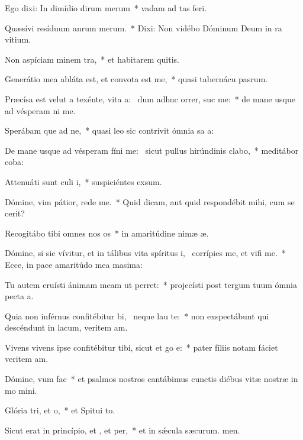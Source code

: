 \item Ego dixi: In dimídio dirum merum~* vadam ad tas feri.
\item Quæsívi resíduum anrum merum.~* Dixi: Non vidébo Dóminum Deum in ra vitium.
\item Non aspíciam minem tra,~* et habitarem quitis.
\item Generátio mea abláta est, et convota est  me,~* quasi tabernácu pasrum.
\item Præcísa est velut a texénte, vita a:~\pscross{} dum adhuc orrer, suc me:~* de mane usque ad vésperam ni me.
\item Sperábam que ad ne,~* quasi leo sic contrívit ómnia sa a:
\item De mane usque ad vésperam fíni me:~\pscross{} sicut pullus hirúndinis  clabo,~* meditábor  coba:
\item Attenuáti sunt culi i,~* suspiciéntes  exsum.
\item Dómine, vim pátior, rede  me.~* Quid dicam, aut quid respondébit mihi, cum se cerit?
\item Recogitábo tibi omnes nos os~* in amaritúdine nimæ æ.
\item Dómine, si sic vívitur, et in tálibus vita spíritus i,~\pscross{} corrípies me, et vifi me.~* Ecce, in pace amaritúdo mea masima:
\item Tu autem eruísti ánimam meam ut  perret:~* projecísti post tergum tuum ómnia pecta a.
\item Quia non inférnus confitébitur bi,~\pscross{} neque  lau te:~* non exspectábunt qui descéndunt in lacum, veritem am.
\item Vivens vivens ipse confitébitur tibi, sicut et go e:~* pater fíliis notam fáciet veritem am.
\item Dómine, vum  fac~* et psalmos nostros cantábimus cunctis diébus vitæ nostræ in mo mini.
\item Glória tri, et o,~* et Spitui to.
\item Sicut erat in princípio, et , et per,~* et in sǽcula sæcurum. men.

